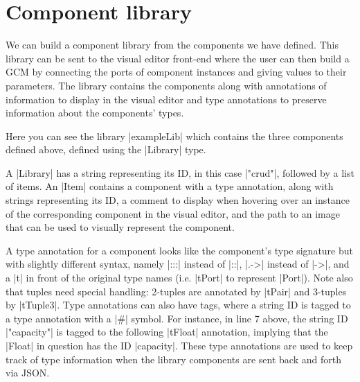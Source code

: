 \documentclass[a4paper]{article}
\begin{document}
\section{Component library}
We can build a component library from the components we have defined.
This library can be sent to the visual editor front-end where the user can then
build a GCM by connecting the ports of component instances and giving values to
their parameters. The library contains the components along with annotations of
information to display in the visual editor and type annotations to preserve
information about the components' types.

Here you can see the library |exampleLib| which contains the three components
defined above, defined using the |Library| type.
A |Library| has a string representing its ID, in this case |"crud"|, followed by
a list of items. An |Item| contains a component with a type annotation,
along with strings representing its ID, a comment to display when hovering over
an instance of the corresponding component in the visual editor, and the path to
an image that can be used to visually represent the component.

A type annotation for a component looks like the component's type signature
but with slightly different syntax, namely |:::| instead of |::|, |.->| instead
of |->|, and a |t| in front of the original type names (i.e. |tPort| to
represent |Port|). Note also that tuples need special handling: 2-tuples are
annotated by |tPair| and 3-tuples by |tTuple3|. Type annotations can also have
tags, where a string ID is tagged to a type annotation with a |#| symbol. For
instance, in line 7 above, the string ID |"capacity"| is tagged to the following
|tFloat| annotation, implying that the |Float| in question has the ID
|capacity|. These type annotations are used to keep track of type information
when the library components are sent back and forth via JSON.
\end{document}
